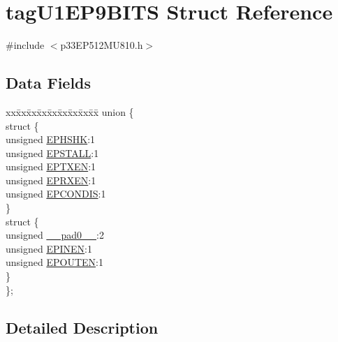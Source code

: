 \hypertarget{structtag_u1_e_p9_b_i_t_s}{}\section{tag\+U1\+E\+P9\+B\+I\+TS Struct Reference}
\label{structtag_u1_e_p9_b_i_t_s}


{\ttfamily \#include $<$p33\+E\+P512\+M\+U810.\+h$>$}

\subsection*{Data Fields}
\begin{DoxyCompactItemize}
\item 
\begin{tabbing}
xx\=xx\=xx\=xx\=xx\=xx\=xx\=xx\=xx\=\kill
union \{\\
\>struct \{\\
\>\>unsigned \hyperlink{structtag_u1_e_p9_b_i_t_s_a0d06430217cb4b189fbe9d0c4b460482}{EPHSHK}:1\\
\>\>unsigned \hyperlink{structtag_u1_e_p9_b_i_t_s_a47042104f04ebe06a23f9789bd400d7e}{EPSTALL}:1\\
\>\>unsigned \hyperlink{structtag_u1_e_p9_b_i_t_s_aa2d88c1be513e759c136823c86a355b4}{EPTXEN}:1\\
\>\>unsigned \hyperlink{structtag_u1_e_p9_b_i_t_s_a8a388d32ceffb87230e660b6793f2857}{EPRXEN}:1\\
\>\>unsigned \hyperlink{structtag_u1_e_p9_b_i_t_s_a1bd26df05d2b5a11b20ee548fce90c3e}{EPCONDIS}:1\\
\>\} \\
\>struct \{\\
\>\>unsigned \hyperlink{structtag_u1_e_p9_b_i_t_s_adf71f3d8410c1f1dbbc96680a92c49af}{\_\_pad0\_\_}:2\\
\>\>unsigned \hyperlink{structtag_u1_e_p9_b_i_t_s_a8b6d98cdf233ac90ff19d16d9a89215e}{EPINEN}:1\\
\>\>unsigned \hyperlink{structtag_u1_e_p9_b_i_t_s_adf87e8acfbb27a5626e21b3e3bd106fd}{EPOUTEN}:1\\
\>\} \\
\}; \\

\end{tabbing}\end{DoxyCompactItemize}


\subsection{Detailed Description}


